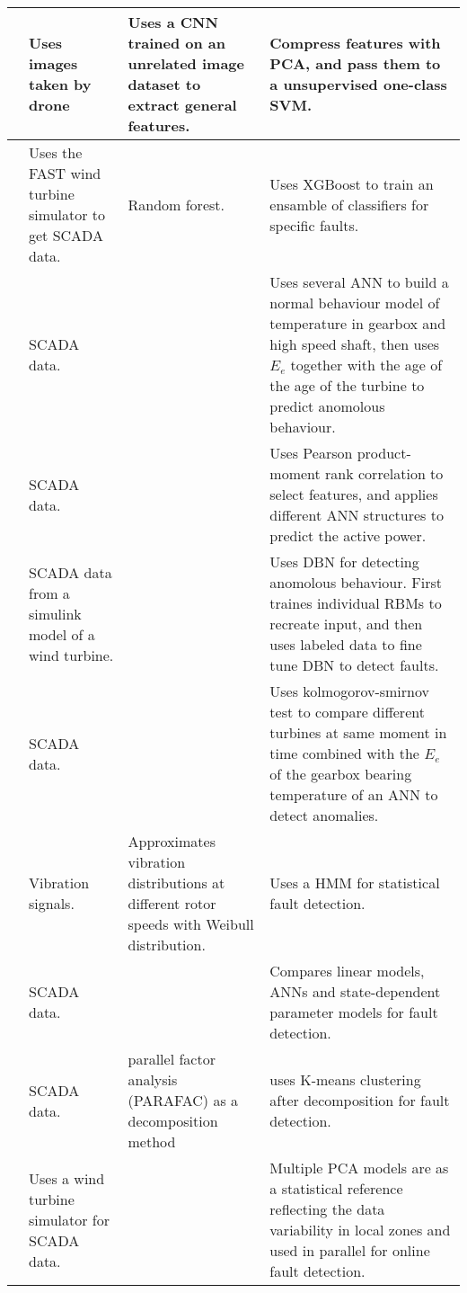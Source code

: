 \begin{longtable}{p{}p{}p{}p{}}
    \cite{unsupervised_AD_blade_damage_deep_features_images} & Uses images taken by drone & Uses a CNN trained on an unrelated image dataset to extract general features. & Compress features with PCA, and pass them to a unsupervised one-class SVM. \\ \hline
    \cite{RF_XGB_fault_detection} & Uses the FAST wind turbine simulator to get SCADA data. & Random forest. & Uses XGBoost to train an ensamble of classifiers for specific faults. \\ \hline
    \cite{CBPM_ABPM_maintainance_model} & SCADA data. & & Uses several ANN to build a normal behaviour model of temperature in gearbox and high speed shaft, then uses $E_e$ together with the age of the age of the turbine to predict anomolous behaviour.\\ \hline
    \cite{improved_power_curve_monitoring_of_wt} & SCADA data. & & Uses Pearson product-moment rank correlation to select features, and applies different ANN structures to predict the active power. \\ \hline
    \cite{DBN_simulink_SCADA_FD} & SCADA data from a simulink model of a wind turbine. & & Uses DBN for detecting anomolous behaviour. First traines individual RBMs to recreate input, and then uses labeled data to fine tune DBN to detect faults. \\ \hline
    \cite{wt_gearbox_bearing_temp_KS_CNN} & SCADA data. &  & Uses kolmogorov-smirnov test to compare different turbines at same moment in time combined with the $E_e$ of the gearbox bearing temperature of an ANN to detect anomalies.\\ \hline
    \cite{fault_monitoring_HMM} & Vibration signals. & Approximates vibration distributions at different rotor speeds with Weibull distribution. & Uses a HMM for statistical fault detection. \\ \hline
    \cite{model_based_fuzzy_logic_cm_wt} & SCADA data. & & Compares linear models, ANNs and state-dependent parameter models for fault detection. \\ \hline
    \cite{fault_detect_PARAFAC_k_means} & SCADA data. & parallel factor analysis (PARAFAC) as a decomposition method & uses K-means clustering after decomposition for fault detection. \\ \hline
    \cite{online_fd_using_PCA_different_operating_zones} & Uses a wind turbine simulator for SCADA data. & & Multiple PCA models are as a statistical reference reflecting the data variability in local zones and used in parallel for online fault detection. \\ \hline

\end{longtable}
